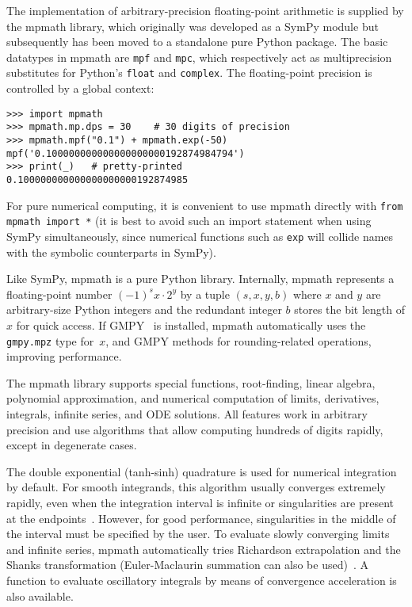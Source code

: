 The implementation of arbitrary-precision floating-point arithmetic is
supplied by the mpmath library, which originally was developed as a SymPy
module but subsequently has been moved to a standalone pure Python package.
The basic datatypes in mpmath are \texttt{mpf} and \texttt{mpc}, which
respectively act as multiprecision substitutes for Python's \texttt{float} and
\texttt{complex}. The floating-point precision is controlled by a global
context:

\begin{verbatim}
>>> import mpmath
>>> mpmath.mp.dps = 30    # 30 digits of precision
>>> mpmath.mpf("0.1") + mpmath.exp(-50)
mpf('0.100000000000000000000192874984794')
>>> print(_)   # pretty-printed
0.100000000000000000000192874985
\end{verbatim}

For pure numerical computing, it is convenient to use mpmath directly
with \texttt{from mpmath import *} (it is best to avoid such an
import statement when using SymPy simultaneously, since numerical
functions such as \texttt{exp} will collide names with the symbolic counterparts
in SymPy).

Like SymPy, mpmath is a pure Python library.
Internally, mpmath represents a floating-point number
${(-1)}^s x \cdot 2^y$ by a tuple $(s, x, y, b)$ where
$x$ and $y$ are arbitrary-size Python integers
and the redundant integer $b$ stores the bit length of $x$ for quick access.
If GMPY~\cite{GMPY} is installed, mpmath automatically uses
the \texttt{gmpy.mpz} type for~$x$, and GMPY methods
for rounding-related operations, improving performance.

The mpmath library supports
special functions, root-finding, linear algebra, polynomial approximation,
and numerical computation of limits, derivatives, integrals, infinite
series, and ODE solutions. All features work in arbitrary precision
and use algorithms that allow computing hundreds of digits rapidly,
except in degenerate cases.

The double exponential (tanh-sinh) quadrature is used for numerical
integration by default. For smooth integrands, this algorithm usually
converges extremely rapidly, even when the integration interval is infinite
or singularities are present at the endpoints~\cite{takahasi1974double,bailey2005comparison}.
However, for good performance, singularities
in the middle of the interval must be specified
by the user.
To evaluate slowly converging limits and infinite series, mpmath
automatically tries Richardson extrapolation and the
Shanks transformation
(Euler-Maclaurin summation can also be used)~\cite{BenderOrszag1999}.
A function to evaluate oscillatory integrals by means of convergence
acceleration is also available.

